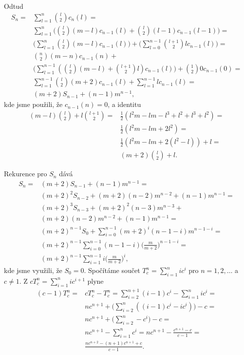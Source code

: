 \documentclass[a4paper,12pt]{article}
\begin{document}
Odtud
\begin{align*} S_n=&\sum_{l=1}^n\binom l2c_n(l)=\\
&\sum_{l=1}^n\big(\binom l2(m-l)c_{n-1}(l)+\binom l2(l-1)c_{n-1}(
l-1)\big)=\\
&\big(\sum_{l=1}^n\binom l2(m-l)c_{n-1}(l)\big)+\big(\sum_{l=0}^{
n-1}\binom {l+1}2lc_{n-1}(l)\big)=\\
&\binom n2(m-n)c_{n-1}(n)+\\
&\big(\sum_{l=1}^{n-1}(\binom l2(m-l)+\binom {l+1}2l)c_{n-1}(l)\big
)+\binom 120c_{n-1}(0)=\\
&\sum_{l=1}^{n-1}\binom l2(m+2)c_{n-1}(l)+\sum_{l=1}^{n-1}lc_{n-1}
(l)=\\
&(m+2)S_{n-1}+(n-1)m^{n-1},\end{align*}
kde jsme použili, že $c_{n-1}(n)=0$, a identitu
\begin{align*}(m-l)\binom l2+l\binom {l+1}2=&\frac 12(l^2m-lm-l^3+l^2+l^
3+l^2)=\\
&\frac 12(l^2m-lm+2l^2)=\\
&\frac 12(l^2m-lm+2(l^2-l))+l=\\
&(m+2)\binom l2+l.\end{align*}

Rekurence pro $S_n$ dává 
\begin{align*} S_n=&(m+2)S_{n-1}+(n-1)m^{n-1}=\\
&(m+2)^2S_{n-2}+(m+2)(n-2)m^{n-2}+(n-1)m^{n-1}=\\
&(m+2)^3S_{n-3}+(m+2)^2(n-3)m^{n-3}+\\
&(m+2)(n-2)m^{n-2}+(n-1)m^{n-1}=\\
&(m+2)^{n-1}S_0+\sum_{i=0}^{n-1}(m+2)^i(n-1-i)m^{n-1-i}=\\
&(m+2)^{n-1}\sum_{i=0}^{n-1}(n-1-i)\big(\frac m{m+2}\big)^{n-1-i}
=\\
&(m+2)^{n-1}\sum_{i=1}^{n-1}i\big(\frac m{m+2}\big)^i,\end{align*}
kde jsme využili, že $S_0=0$. Spočítáme součet 
$T_c^n=\sum_{i=1}^nic^i$ pro $n=1,2,\dots$ a $c\ne 1$. Z
$cT_c^n=\sum_{i=1}^nic^{i+1}$ plyne 
\begin{align*}(c-1)T_c^n=&cT_c^n-T_c^n=\sum_{i=2}^{n+1}(i-1)c^i-\sum_{i
=1}^nic^i=\\
&nc^{n+1}+\big(\sum_{i=2}^n((i-1)c^i-ic^i)\big)-c=\\
&nc^{n+1}+\big(\sum_{i=2}^n-c^i\big)-c=\\
&nc^{n+1}-\sum_{i=1}^nc^i=nc^{n+1}-\frac {c^{n+1}-c}{c-1}=\\
&\frac {nc^{n+2}-(n+1)c^{n+1}+c}{c-1}.\end{align*}
\end{document}
